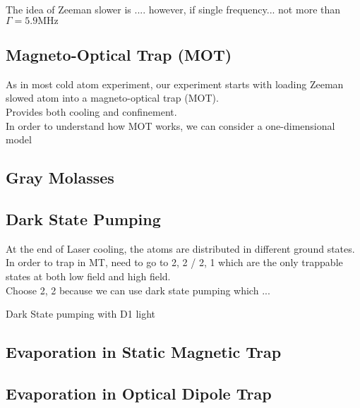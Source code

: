 The idea of Zeeman slower is .... however, if single frequency... not more than $\Gamma=5.9\text{MHz}$


\subsection{Magneto-Optical Trap (MOT)}\label{theory:mot}

As in most cold atom experiment, our experiment starts with loading Zeeman slowed atom into a magneto-optical trap (MOT).\\
Provides both cooling and confinement.\\
In order to understand how MOT works, we can consider a one-dimensional model\\

\subsection{Gray Molasses}\label{theory:gm}

\subsection{Dark State Pumping}\label{theory:pump}
At the end of Laser cooling, the atoms are distributed in different ground states.\\
In order to trap in MT, need to go to 2, 2 / 2, 1 which are the only trappable states at both low field and high field.\\
Choose 2, 2 because we can use dark state pumping which ...

Dark State pumping with D1 light

\subsection{Evaporation in Static Magnetic Trap}\label{theory:mt}

\subsection{Evaporation in Optical Dipole Trap}\label{theory:odt}
